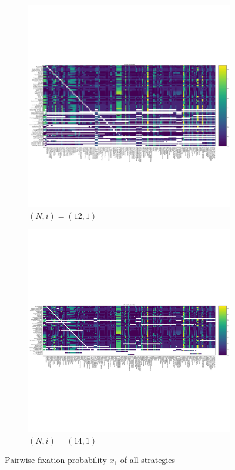 \documentclass{article}
\begin{document}
\begin{figure}[!hbtp]
\begin{subfigure}[t]{.3\textwidth}
        \centering
        \includegraphics[width=.8\textwidth]{../img/fixation_heatmap_12_1_std.pdf}
        \caption{\((N,i)=(12, 1)\)}
    \end{subfigure}%

    \begin{subfigure}[t]{.3\textwidth}
        \centering
        \includegraphics[width=.8\textwidth]{../img/fixation_heatmap_14_1_std.pdf}
        \caption{\((N,i)=(14, 1)\)}
    \end{subfigure}%
    \caption{Pairwise fixation probability \(x_{1}\) of all strategies}
    \label{fig:fixation_heatmap_1_std}
\end{figure}
\end{document}

